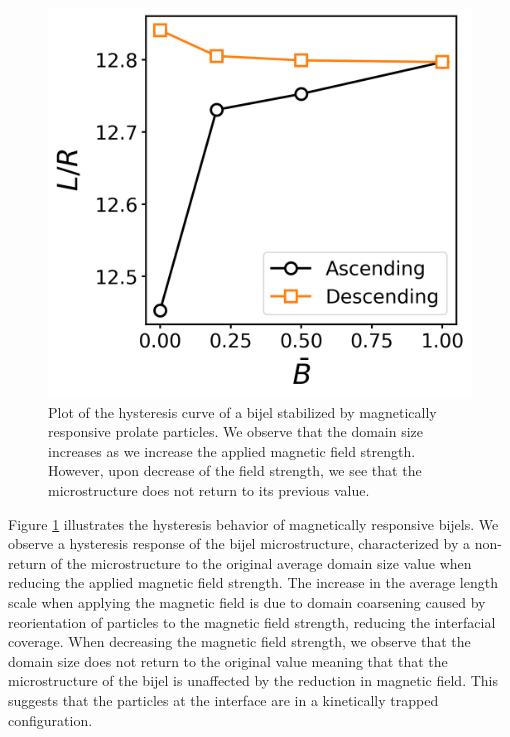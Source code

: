 \begin{figure} 
    \centering 
    \includegraphics[scale=0.5]{../figures/results/paper2/hysteresis_curve.png} 
    \caption{Plot of the hysteresis curve of a bijel stabilized by magnetically responsive prolate particles. We observe that the domain size increases as we increase the applied
    magnetic field strength. However, upon decrease of the field strength, we see that the microstructure does not return to its previous value.} 
    \label{fig:hysteresis_curve} 
\end{figure}

Figure \ref{fig:hysteresis_curve} illustrates the hysteresis behavior of magnetically responsive bijels. We observe a hysteresis response of the 
bijel microstructure, characterized by a non-return of the microstructure to the original average domain size value when reducing the applied 
magnetic field strength. The increase in the average length scale when applying the magnetic field is due to domain coarsening caused by 
reorientation of particles to the magnetic field strength, reducing the interfacial coverage. When decreasing the magnetic field strength, 
we observe that the domain size does not return to the original value meaning that that the microstructure of the bijel is unaffected by 
the reduction in magnetic field. This suggests that the particles at the interface are in a kinetically trapped configuration.

